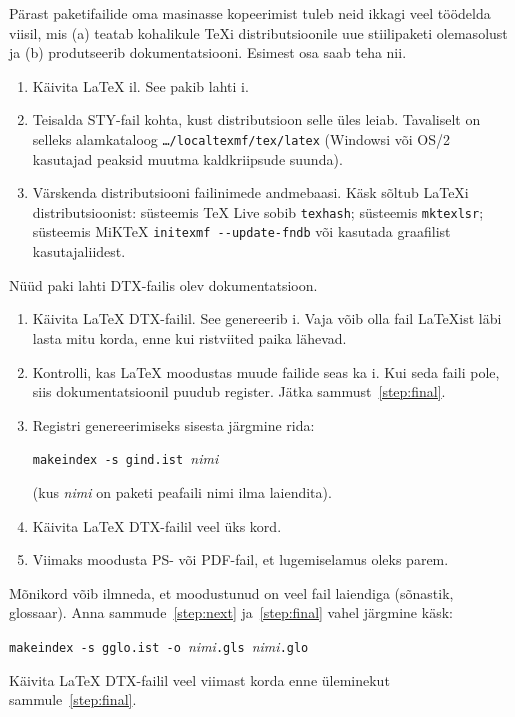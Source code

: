 Pärast paketifailide oma masinasse kopeerimist tuleb neid ikkagi veel
töödelda viisil, mis (a) teatab kohalikule \TeX i distributsioonile uue
stiilipaketi olemasolust ja (b) produtseerib dokumentatsiooni. Esimest
osa saab teha nii.

\begin{enumerate}
  \item Käivita \LaTeX{} il. See pakib lahti i.
  \item Teisalda STY-fail kohta, kust distributsioon selle üles leiab.
Tavaliselt on selleks alamkataloog \texttt{\ldots/localtexmf/tex/latex}
(Windowsi või OS/2 kasutajad peaksid muutma kaldkriipsude suunda).
  \item Värskenda distributsiooni failinimede andmebaasi. Käsk sõltub
\LaTeX i distributsioonist: süsteemis \TeX{}
Live sobib \texttt{texhash}; süsteemis
 \texttt{mktexlsr};
süsteemis MiK\TeX{}
\texttt{initexmf -{}-update-fndb} või
kasutada graafilist kasutajaliidest.
\end{enumerate}

\noindent Nüüd paki lahti DTX-failis olev dokumentatsioon.

\begin{enumerate}
  \item Käivita \LaTeX{} DTX-failil. See genereerib i. Vaja
võib olla fail \LaTeX ist läbi lasta mitu korda, enne kui ristviited
paika lähevad.
  \item Kontrolli, kas \LaTeX{} moodustas muude failide seas ka
i. Kui seda faili pole, siis dokumentatsioonil puudub register.
Jätka sammust~\ref{step:final}.
  \item Registri genereerimiseks sisesta järgmine rida:
\begin{lscommand}
\texttt{makeindex -s gind.ist }\textit{nimi}
\end{lscommand} (kus \textit{nimi}
on paketi peafaili nimi ilma laiendita).
  \item Käivita \LaTeX{} DTX-failil veel üks kord. \label{step:next}
  \item Viimaks moodusta PS- või PDF-fail, et lugemiselamus oleks
parem.\label{step:final}
\end{enumerate}

Mõnikord võib ilmneda, et moodustunud on veel fail laiendiga 
(sõnastik, glossaar). Anna sammude~\ref{step:next} ja~\ref{step:final}
vahel järgmine käsk:
\begin{lscommand}
\texttt{makeindex -s gglo.ist -o }\textit{nimi}\texttt{.gls
}\textit{nimi}\texttt{.glo}
\end{lscommand}
\noindent Käivita \LaTeX{} DTX-failil veel viimast korda enne üleminekut
sammule~\ref{step:final}.


